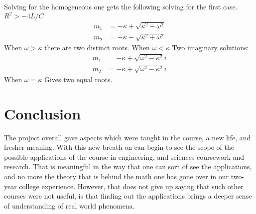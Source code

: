 \documentclass[11pt]{article} %
\begin{document}
Solving for the homogeneous one gets the following solving for the first case. $R^2>-4L/C$ \begin{align*}
m_1&=-\kappa+\sqrt{\kappa^2-\omega^2} \\ m_2&=-\kappa-\sqrt{\kappa^2+\omega^2}
\end{align*}
When $\omega>\kappa$ there are two distinct roots. When $\omega<\kappa$ Two imaginary solutions: \begin{align*} m_1&=-\kappa+\sqrt{\omega^2-\kappa^2}i \\ m_2&=-\kappa+\sqrt{\omega^2-\kappa^2}i \end{align*} When $\omega=\kappa$ Gives two equal roots.
\newpage
\section{Conclusion}
The project overall gave aspects which were taught in the course, a new life, and fresher meaning. With this new breath on can begin to see the scope of the possible applications of the course in engineering, and sciences coursework and research. That is meaningful in the way that one can sort of see the applications, and no more the theory that is behind the math one has gone over in our two-year college experience. However, that does not give up saying that such other courses were not useful, is that finding out the applications brings a deeper sense of understanding of real world phenomena. 
\end{document}
